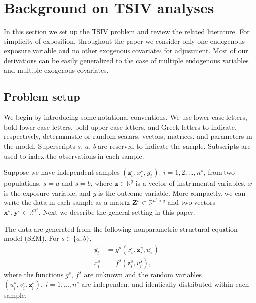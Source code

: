 \documentclass[preprint]{imsart}
\begin{document}
\section{Background on TSIV analyses}
\label{sec:backgr-tsiv-analys}

In this section we set up the TSIV problem and review the related
literature. For simplicity of exposition, throughout the paper we
consider only one endogenous exposure variable and no other
exogenous covariates for adjustment.
Most of our derivations can be easily generalized to the case
of multiple endogenous variables and multiple exogenous covariates.

\subsection{Problem setup}
\label{sec:setup}

We begin by introducing some notational conventions. We use lower-case
letters, bold lower-case letters, bold
upper-case letters, and Greek letters to indicate, respectively,
deterministic or random scalars, vectors, matrices, and parameters in
the model. Superscripts $s$, $a$, $b$ are reserved to indicate the
sample. Subscripts are used to index the observations in each sample.

Suppose we have independent samples
$(\mathbf{z}_i^s,x_i^s,y_i^s),~i=1,2,\dotsc,n^s$,
from two populations, $s = a$ and $s = b$, where $\mathbf{z} \in \mathbb{R}^q$ is
a vector of instrumental variables, $x$ is the exposure variable,
and $y$ is the outcome variable. More compactly, we can write the data
in each sample as a matrix $\mathbf{Z}^s \in \mathbb{R}^{n^s \times
  q}$ and two vectors $\mathbf{x}^s,\mathbf{y}^s \in
\mathbb{R}^{n^s}$. Next we describe the general setting in this
paper.

\begin{assumption} \label{assump:npsem}
  The data are generated from the following
  nonparametric structural equation model (SEM). For $s \in \{a,b\}$,
  \begin{align}
    y_i^s &= g^s(x_i^s,\mathbf{z}_i^s,u_i^s), \label{eq:npsem-outcome} \\
    x_i^s &= f^s(\mathbf{z}_i^s, v_i^s), \label{eq:npsem-exposure}
  \end{align}
  where the functions $g^s$, $f^s$ are unknown and the random variables
  $(u^s_i,v^s_i,\mathbf{z}^s_i),~i=1,\dotsc,n^s$ are independent and
  identically distributed within each sample.
\end{assumption}
\end{document}
